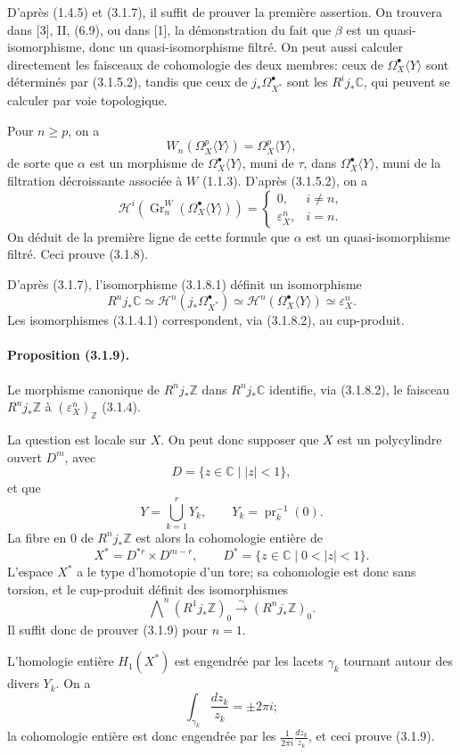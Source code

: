 \documentclass[10pt]{article}
\newcommand{\C}{\mathbb C}
\newcommand{\Z}{\mathbb Z}
\newcommand{\Gr}{\operatorname{Gr}}
\begin{document}
D'après (1.4.5) et (3.1.7), il suffit de prouver la première assertion. On trouvera dans [3], II, (6.9), ou dans [1], la démonstration du fait que $\beta$ est un quasi-isomorphisme, donc un quasi-isomorphisme filtré. On peut aussi calculer directement les faisceaux de cohomologie des deux membres: ceux de $\Omega_X^\bullet\langle Y\rangle$ sont déterminés par (3.1.5.2), tandis que ceux de $j_*\Omega_{X^*}^\bullet$ sont les $R^ij_*\C$, qui peuvent se calculer par voie topologique.

Pour $n\ge p$, on a
\[
W_n(\Omega_X^p\langle Y\rangle)=\Omega_X^p\langle Y\rangle,
\]
de sorte que $\alpha$ est un morphisme de $\Omega_X^\bullet\langle Y\rangle$, muni de $\tau$, dans $\Omega_X^\bullet\langle Y\rangle$, muni de la filtration décroissante associée à $W$ (1.1.3). D'après (3.1.5.2), on a
\[
\tag{3.1.8.1}
\mathcal H^i(\Gr_n^W(\Omega_X^\bullet\langle Y\rangle))=
\begin{cases}
0,& i\ne n,\\
\varepsilon_X^n,& i=n.
\end{cases}
\]
On déduit de la première ligne de cette formule que $\alpha$ est un quasi-isomorphisme filtré. Ceci prouve (3.1.8).

D'après (3.1.7), l'isomorphisme (3.1.8.1) définit un isomorphisme
\[
\tag{3.1.8.2}
R^nj_*\C\simeq \mathcal H^n(j_*\Omega_{X^*}^\bullet)
\simeq \mathcal H^n(\Omega_X^\bullet\langle Y\rangle)
\simeq \varepsilon_X^n.
\]
Les isomorphismes (3.1.4.1) correspondent, via (3.1.8.2), au cup-produit.

\paragraph{Proposition (3.1.9).} Le morphisme canonique de $R^nj_*\Z$ dans $R^nj_*\C$ identifie, via (3.1.8.2), le faisceau $R^nj_*\Z$ à $(\varepsilon_X^n)_\Z$ (3.1.4).

La question est locale sur $X$. On peut donc supposer que $X$ est un polycylindre ouvert $D^m$, avec
\[
D=\{z\in\C\mid |z|<1\},
\]
et que
\[
Y=\bigcup_{k=1}^r Y_k,\qquad Y_k=\operatorname{pr}_k^{-1}(0).
\]
La fibre en $0$ de $R^nj_*\Z$ est alors la cohomologie entière de
\[
X^*=D^{*r}\times D^{m-r},
\qquad
D^*=\{z\in\C\mid 0<|z|<1\}.
\]
L'espace $X^*$ a le type d'homotopie d'un tore; sa cohomologie est donc sans torsion, et le cup-produit définit des isomorphismes
\[
\bigwedge\nolimits^n(R^1j_*\Z)_0\xrightarrow{\sim}(R^nj_*\Z)_0.
\]
Il suffit donc de prouver (3.1.9) pour $n=1$.

L'homologie entière $H_1(X^*)$ est engendrée par les lacets $\gamma_k$ tournant autour des divers $Y_k$. On a
\[
\int_{\gamma_k}\frac{dz_k}{z_k}=\pm2\pi i;
\]
la cohomologie entière est donc engendrée par les $\frac1{2\pi i}\frac{dz_k}{z_k}$, et ceci prouve (3.1.9).
\end{document}
